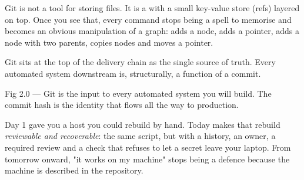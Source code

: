\begin{keyidea}
Git is not a tool for storing files. It is a  with a small key-value store (refs) layered on top. Once you see that, every command stops being a spell to memorise and becomes an obvious manipulation of a graph:  adds a node,  adds a pointer,  adds a node with two parents,  copies nodes and moves a pointer.
\end{keyidea}

 Git sits at the top of the delivery chain as the single source of truth. Every automated system downstream is, structurally, a function of a commit.

\begin{wbfigure}{Fig 2.0 — Git is the input to every automated system you will build. The commit hash is the identity that flows all the way to production.}
\end{wbfigure}

 Day 1 gave you a host you could rebuild by hand. Today makes that rebuild \emph{reviewable and recoverable}: the same script, but with a history, an owner, a required review and a check that refuses to let a secret leave your laptop. From tomorrow onward, "it works on my machine" stops being a defence because the machine is described in the repository.

